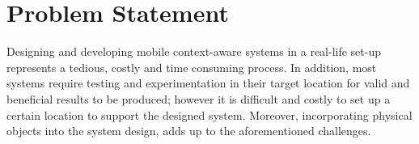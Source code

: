\section{Problem Statement} %
\label{sec:problem_statement}

Designing and developing mobile context-aware systems in a real-life set-up represents a tedious, costly and time consuming process. In addition, most systems require testing and experimentation in their target location for valid and beneficial results to be produced; however it is difficult and costly to set up a certain location to support the designed system. Moreover, incorporating physical objects into the system design, adds up to the aforementioned challenges.



